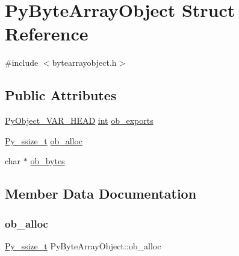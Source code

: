 \hypertarget{struct_py_byte_array_object}{}\section{Py\+Byte\+Array\+Object Struct Reference}
\label{struct_py_byte_array_object}


{\ttfamily \#include $<$bytearrayobject.\+h$>$}

\subsection*{Public Attributes}
\begin{DoxyCompactItemize}
\item 
\mbox{\hyperlink{_python27_2object_8h_aa0eba161a76be8710b3de325c2e7f9e2}{Py\+Object\+\_\+\+V\+A\+R\+\_\+\+H\+E\+AD}} \mbox{\hyperlink{warnings_8h_a74f207b5aa4ba51c3a2ad59b219a423b}{int}} \mbox{\hyperlink{struct_py_byte_array_object_a302f6ed193ac551931000971ac882169}{ob\+\_\+exports}}
\item 
\mbox{\hyperlink{pyport_8h_ac6411a3dfda9ac6feb9e8d859b1184bc}{Py\+\_\+ssize\+\_\+t}} \mbox{\hyperlink{struct_py_byte_array_object_a5af2f0ff78873b2ee1fd81e6d4fde508}{ob\+\_\+alloc}}
\item 
char $\ast$ \mbox{\hyperlink{struct_py_byte_array_object_a115f41ec4bbe6444f2331a8080a226e8}{ob\+\_\+bytes}}
\end{DoxyCompactItemize}


\subsection{Member Data Documentation}
\mbox{\label{struct_py_byte_array_object_a5af2f0ff78873b2ee1fd81e6d4fde508}} 
\subsubsection{\texorpdfstring{ob\_alloc}{ob\_alloc}}
{\footnotesize\ttfamily \mbox{\hyperlink{pyport_8h_ac6411a3dfda9ac6feb9e8d859b1184bc}{Py\+\_\+ssize\+\_\+t}} Py\+Byte\+Array\+Object\+::ob\+\_\+alloc}

\mbox{\label{struct_py_byte_array_object_a115f41ec4bbe6444f2331a8080a226e8}} 
